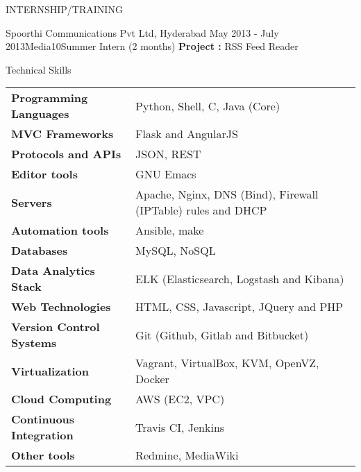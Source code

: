\documentclass{resume} %
\begin{document}
\begin{rSection}{INTERNSHIP/TRAINING}
  \begin{rSubsection}
  {Spoorthi Communications Pvt Ltd, Hyderabad} {May 2013 - July
    2013}{Media10}{Summer Intern (2 months)}
  \textbf{Project :} RSS Feed Reader
  \end{rSubsection} 

\end{rSection} 

\break


\begin{rSection}
  {Technical Skills}

  \begin{tabular}{ @{} >{\bfseries}l @{\hspace{2ex}} l }
    Programming Languages & Python, Shell, C, Java (Core)
    \\ MVC Frameworks & Flask and AngularJS\\ Protocols and
    APIs & JSON, REST \\ Editor tools & GNU Emacs \\ Servers
    & Apache, Nginx, DNS (Bind), Firewall (IPTable) rules
    and DHCP \\ Automation tools & Ansible, make
    \\ Databases & MySQL, NoSQL \\ Data Analytics Stack &
    ELK (Elasticsearch, Logstash and Kibana) \\ Web
    Technologies & HTML, CSS, Javascript, JQuery and PHP
    \\ Version Control Systems & Git (Github, Gitlab and
    Bitbucket) \\ Virtualization & Vagrant, VirtualBox, KVM,
    OpenVZ, Docker \\ Cloud Computing & AWS (EC2, VPC)
    \\ Continuous Integration & Travis CI, Jenkins \\ Other
    tools & Redmine, MediaWiki
    
  \end{tabular}

\end{rSection}
\end{document}

